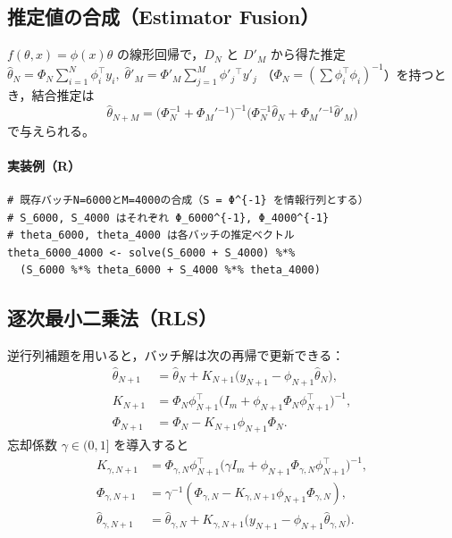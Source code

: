 
\subsection{推定値の合成（Estimator Fusion）}
$f(\theta,x)=\phi(x)\theta$ の線形回帰で，$D_N$ と $D'_M$ から得た推定
\(
\hat\theta_N=\Phi_N \sum_{i=1}^N \phi_i^\top y_i,\;
\hat\theta'_M=\Phi'_M \sum_{j=1}^M \phi'_j{}^\top y'_j
\)
（$\Phi_N=(\sum \phi_i^\top\phi_i)^{-1}$）を持つとき，結合推定は
\[
  \hat\theta_{N+M}
  =\bigl(\Phi_N^{-1}+\Phi_M'{}^{-1}\bigr)^{-1}
   \bigl(\Phi_N^{-1}\hat\theta_N+\Phi_M'{}^{-1}\hat\theta'_M\bigr)
\]
で与えられる。\cite{exp2025}

\paragraph{実装例（R）}
\begin{lstlisting}
# 既存バッチN=6000とM=4000の合成（S = Φ^{-1} を情報行列とする）
# S_6000, S_4000 はそれぞれ Φ_6000^{-1}, Φ_4000^{-1}
# theta_6000, theta_4000 は各バッチの推定ベクトル
theta_6000_4000 <- solve(S_6000 + S_4000) %*%
  (S_6000 %*% theta_6000 + S_4000 %*% theta_4000)
\end{lstlisting}

\subsection{逐次最小二乗法（RLS）}
逆行列補題を用いると，バッチ解は次の再帰で更新できる：
\[
\begin{aligned}
  \hat\theta_{N+1} &= \hat\theta_N + K_{N+1}\bigl(y_{N+1}-\phi_{N+1}\hat\theta_N\bigr),\\
  K_{N+1} &= \Phi_N \phi_{N+1}^\top\bigl(I_m + \phi_{N+1}\Phi_N\phi_{N+1}^\top\bigr)^{-1},\\
  \Phi_{N+1} &= \Phi_N - K_{N+1}\phi_{N+1}\Phi_N .
\end{aligned}
\]
忘却係数 $\gamma\in(0,1]$ を導入すると
\[
\begin{aligned}
  K_{\gamma,N+1} &= \Phi_{\gamma,N}\phi_{N+1}^\top
    \bigl(\gamma I_m+\phi_{N+1}\Phi_{\gamma,N}\phi_{N+1}^\top\bigr)^{-1},\\
  \Phi_{\gamma,N+1} &= \gamma^{-1}\!\left(\Phi_{\gamma,N}-K_{\gamma,N+1}\phi_{N+1}\Phi_{\gamma,N}\right),\\
  \hat\theta_{\gamma,N+1} &= \hat\theta_{\gamma,N} +
    K_{\gamma,N+1}\bigl(y_{N+1}-\phi_{N+1}\hat\theta_{\gamma,N}\bigr).
\end{aligned}
\]
\cite{exp2025}


